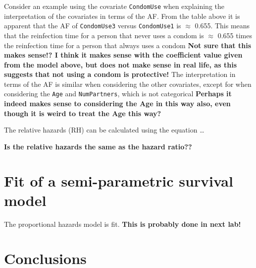 \documentclass[
]{article}
\begin{document}
Consider an example using the covariate \texttt{CondomUse} when explaining the interpretation of the covariates in terms of the AF. From the table above it is apparent that the AF of \texttt{CondomUse3} versus \texttt{CondomUse1} is \(\approx\) 0.655. This means that the reinfection time for a person that never uses a condom is \(\approx\) 0.655 times the reinfection time for a person that always uses a condom \textbf{Not sure that this makes sense!? I think it makes sense with the coefficient value given from the model above, but does not make sense in real life, as this suggests that not using a condom is protective!} The interpretation in terms of the AF is similar when considering the other covariates, except for when considering the \texttt{Age} and \texttt{NumPartners}, which is not categorical \textbf{Perhaps it indeed makes sense to considering the Age in this way also, even though it is weird to treat the Age this way?}

The relative hazards (RH) can be calculated using the equation \ldots{}

\textbf{Is the relative hazards the same as the hazard ratio??}

\hypertarget{fit-of-a-semi-parametric-survival-model}{%
\section{Fit of a semi-parametric survival model}\label{fit-of-a-semi-parametric-survival-model}}

The proportional hazards model is fit. \textbf{This is probably done in next lab!}

\hypertarget{conclusions}{%
\section{Conclusions}\label{conclusions}}
\end{document}
